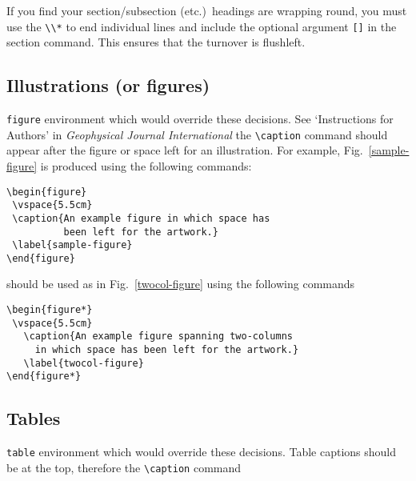 If you find your section/subsection (etc.)\ headings are wrapping round, you
must use the \verb"\\*" to end individual lines and include the optional
argument \verb"[]" in the section command. This ensures that the turnover is
flushleft.

\subsection{Illustrations (or figures)}

\begin{figure*}
 \vspace{5.5cm}
  \caption{An example figure spanning two-columns in which space has been left
  for the artwork.}\label{twocol-figure}
\end{figure*}

\verb"figure" environment which would override these decisions. See
`Instructions for Authors' in {\em Geophysical Journal International\/}
the \verb"\caption" command should appear after the figure or space
left for an illustration. For example, Fig.~\ref{sample-figure} is
produced using the following commands:
\begin{verbatim}
\begin{figure}
 \vspace{5.5cm}
 \caption{An example figure in which space has
          been left for the artwork.}
 \label{sample-figure}
\end{figure}
\end{verbatim}

should be used as in  Fig.~\ref{twocol-figure} using the following commands
\begin{verbatim}
\begin{figure*}
 \vspace{5.5cm}
   \caption{An example figure spanning two-columns
     in which space has been left for the artwork.}
   \label{twocol-figure}
\end{figure*}
\end{verbatim}

\subsection{Tables}

\verb"table" environment which would override these decisions. Table
captions should be at the top, therefore the \verb"\caption" command

